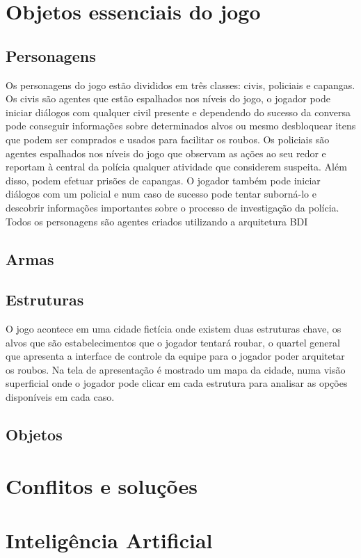 \section{Objetos essenciais do jogo}

\subsection{Personagens}
Os personagens do jogo estão divididos em três classes: civis, policiais e capangas.
Os civis são agentes que estão espalhados nos níveis do jogo, o jogador pode iniciar diálogos com qualquer civil presente e dependendo do sucesso da conversa pode conseguir informações sobre determinados alvos ou mesmo desbloquear itens que podem ser comprados e usados para facilitar os roubos.
Os policiais são agentes espalhados nos níveis do jogo que observam as ações ao seu redor e reportam à central da polícia qualquer atividade que considerem suspeita. Além disso, podem efetuar prisões de capangas. O jogador também pode iniciar diálogos com um policial e num caso de sucesso pode tentar suborná-lo e descobrir informações importantes sobre o processo de investigação da polícia.
Todos os personagens são agentes criados utilizando a arquitetura BDI
\subsection{Armas}
\subsection{Estruturas}
O jogo acontece em uma cidade fictícia onde existem duas estruturas chave, os alvos que são estabelecimentos que o jogador tentará roubar, o quartel general que apresenta a interface de controle da equipe para o jogador poder arquitetar os roubos.
Na tela de apresentação é mostrado um mapa da cidade, numa visão superficial onde o jogador pode clicar em cada estrutura para analisar as opções disponíveis em cada caso.
\subsection{Objetos}

\section{Conflitos e soluções}
\section{Inteligência Artificial}
